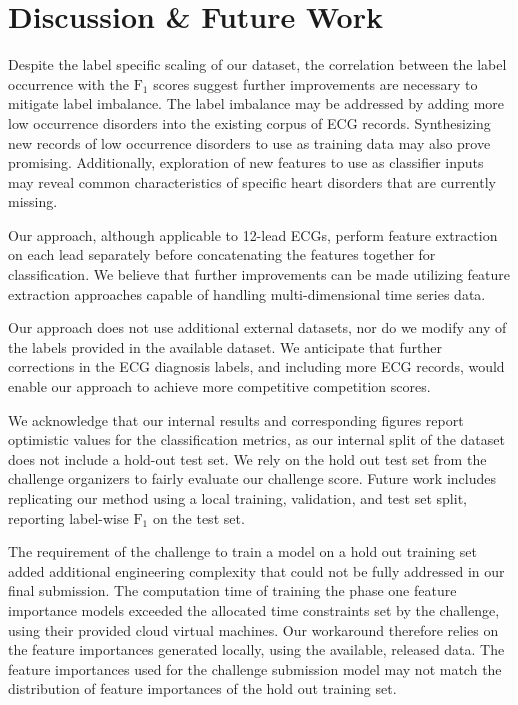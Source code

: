 \documentclass[twocolumn]{cinc}
\begin{document}
\section{Discussion \& Future Work}

Despite the label specific scaling of our dataset, the correlation between the label occurrence with the $\text{F}_1$ scores suggest further improvements are necessary to mitigate label imbalance.
The label imbalance may be addressed by adding more low occurrence disorders into the existing corpus of ECG records.
Synthesizing new records of low occurrence disorders to use as training data may also prove promising.
Additionally, exploration of new features to use as classifier inputs may reveal common characteristics of specific heart disorders that are currently missing.

Our approach, although applicable to 12-lead ECGs, perform feature extraction on each lead separately before concatenating the features together for classification.
We believe that further improvements can be made utilizing feature extraction approaches capable of handling multi-dimensional time series data.

Our approach does not use additional external datasets, nor do we modify any of the labels provided in the available dataset.
We anticipate that further corrections in the ECG diagnosis labels, and including more ECG records, would enable our approach to achieve more competitive competition scores.

We acknowledge that our internal results and corresponding figures report optimistic values for the classification metrics, as our internal split of the dataset does not include a hold-out test set.
We rely on the hold out test set from the challenge organizers to fairly evaluate our challenge score.
Future work includes replicating our method using a local training, validation, and test set split, reporting label-wise $\text{F}_1$ on the test set.

The requirement of the challenge to train a model on a hold out training set added additional engineering complexity that could not be fully addressed in our final submission.
The computation time of training the phase one feature importance models exceeded the allocated time constraints set by the challenge, using their provided cloud virtual machines.
Our workaround therefore relies on the feature importances generated locally, using the available, released data.
The feature importances used for the challenge submission model may not match the distribution of feature importances of the hold out training set.
\end{document}
